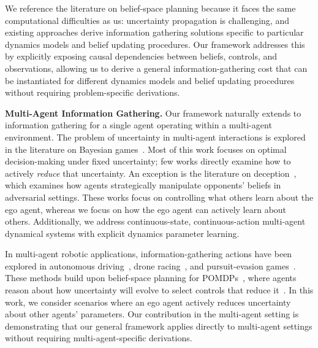 We reference the literature on belief-space planning because it faces the same computational difficulties as us: uncertainty propagation is challenging, and existing approaches derive information gathering solutions specific to particular dynamics models and belief updating procedures.
Our framework addresses this by explicitly exposing causal dependencies between beliefs, controls, and observations, allowing us to derive a general information-gathering cost that can be instantiated for different dynamics models and belief updating procedures without requiring problem-specific derivations.

\textbf{Multi-Agent Information Gathering.}
Our framework naturally extends to information gathering for a single agent operating within a multi-agent environment.
The problem of uncertainty in multi-agent interactions is explored in the literature on Bayesian games~\cite{harsanyi1967games,osborne2004introduction,shoham2008multiagent}.
Most of this work focuses on optimal decision-making under fixed uncertainty; few works directly examine how to actively \emph{reduce} that uncertainty.
An exception is the literature on deception~\cite{hespanha2000deception, rostobaya2023deception, xu2016modeling, fuchs2012sequential, vurankaya2025deceptive, palafox2024smooth}, which examines how agents strategically manipulate opponents' beliefs in adversarial settings. 
These works focus on controlling what others learn about the ego agent, whereas we focus on how the ego agent can actively learn about others. 
Additionally, we address continuous-state, continuous-action multi-agent dynamical systems with explicit dynamics parameter learning.

In multi-agent robotic applications, information-gathering actions have been explored in autonomous driving~\cite{sadigh2016information, hu2024active, knaup2024active, knaup2025dual, gadginmath2025active, wang2023active, sagheb2025unified}, drone racing~\cite{schwarting2021stochastic}, and pursuit-evasion games~\cite{krusniak2025online}.
These methods build upon belief-space planning for POMDPs~\cite{kaelbling1998planning, platt2010belief, van2012motion, van2016motion, patil2015scaling, gmytrasiewicz2004interactive}, where agents reason about how uncertainty will evolve to select controls that reduce it~\cite{taylor2021active}.
In this work, we consider scenarios where an ego agent actively reduces uncertainty about other agents' parameters. 
Our contribution in the multi-agent setting is demonstrating that our general framework applies directly to multi-agent settings without requiring multi-agent-specific derivations.